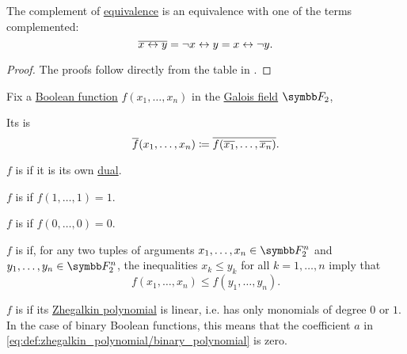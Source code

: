 \begin{proposition}
\begin{PropEnum}
     The complement of \hyperref[def:propositional_alphabet/connectives/equivalence]{equivalence} is an equivalence with one of the terms complemented:
    \begin{equation}\label{eq:thm:boolean_equivalences/equivalence_complement}
      \overline{x \leftrightarrow y} = \neg x \leftrightarrow y = x \leftrightarrow \neg y.
    \end{equation}
  \end{PropEnum}
\end{proposition}
\begin{proof}
  The proofs follow directly from the table in .
\end{proof}

\begin{definition}\label{def:boolean_functions_in_f2}
  Fix a \hyperref[def:boolean_function]{Boolean function} \( f(x_1, \ldots, x_n) \) in the \hyperref[thm:galois_field_existence]{Galois field} \( \BF_2 \),

  \begin{DefEnum}
     Its  is
    \begin{equation*}
      \overline{f}(x_1, \ldots, x_n) \coloneqq \overline{f(\overline{x_1}, \ldots, \overline{x_n})}.
    \end{equation*}

     \( f \) is  if it is its own \hyperref[def:boolean_function_in_f2/dual]{dual}.

     \( f \) is  if \( f(1, \ldots, 1) = 1 \).

     \( f \) is  if \( f(0, \ldots, 0) = 0 \).

     \( f \) is  if, for any two tuples of arguments \( x_1, \ldots, x_n \in \BF_2^n \) and \( y_1, \ldots, y_n \in \BF_2^n \), the inequalities \( x_k \leq y_k \) for all \( k = 1, \ldots, n \) imply that
    \begin{equation*}
      f(x_1, \ldots, x_n) \leq f(y_1, \ldots, y_n).
    \end{equation*}

     \( f \) is  if its \hyperref[def:zhegalkin_polynomial]{Zhegalkin polynomial} is linear, i.e. has only monomials of degree \( 0 \) or \( 1 \). In the case of binary Boolean functions, this means that the coefficient \( a \) in \eqref{eq:def:zhegalkin_polynomial/binary_polynomial} is zero.
  \end{DefEnum}
\end{definition}

